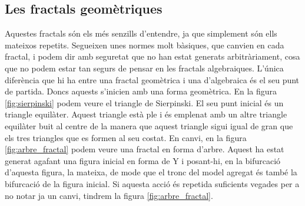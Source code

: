 \subsection{Les fractals geomètriques}
Aquestes fractals són els més senzills d'entendre, ja que simplement són ells mateixos repetits. Segueixen unes normes molt bàsiques, que canvien en cada fractal, i podem dir amb seguretat que no han estat generats arbitràriament, cosa que no podem estar tan segurs de pensar en les fractals algebraiques. \n
L'única diferència que hi ha entre una fractal geomètrica i una d'algebraica és el seu punt de partida. Doncs aquests s'inicien amb una forma geomètrica. \n
En la figura \ref{fig:sierpinski} podem veure el triangle de Sierpinski. El seu punt inicial és un triangle equilàter. Aquest triangle està ple i és emplenat amb un altre triangle equilàter buit al centre de la manera que aquest triangle sigui igual de gran que els tres triangles que es formen al seu costat. \n
En canvi, en la figura \ref{fig:arbre_fractal} podem veure una fractal en forma d'arbre. Aquest ha estat generat agafant una figura inicial en forma de Y i posant-hi, en la bifurcació d'aquesta figura, la mateixa, de mode que el tronc del model agregat és també la bifurcació de la figura inicial. Si aquesta acció és repetida suficients vegades per a no notar ja un canvi, tindrem la figura \ref{fig:arbre_fractal}.

